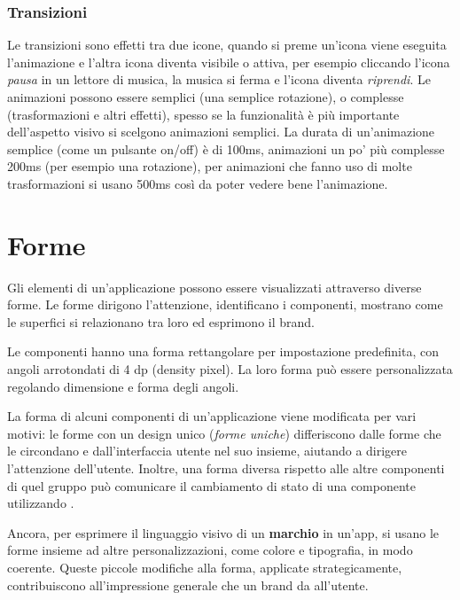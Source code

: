 \documentclass[12pt, a4paper]{report}
\begin{document}
			\subsubsection{Transizioni}
				Le transizioni sono effetti tra due icone, quando si preme un'icona viene eseguita l'animazione e l'altra icona diventa visibile o attiva, per esempio cliccando l'icona \textit{pausa} in un lettore di musica, la musica si ferma e l'icona diventa \textit{riprendi}.
				Le animazioni possono essere semplici (una semplice rotazione), o complesse (trasformazioni e altri effetti), spesso se la funzionalità è più importante dell'aspetto visivo si scelgono animazioni semplici.
				La durata di un'animazione semplice (come un pulsante on/off) è di 100ms, animazioni un po' più complesse 200ms (per esempio una rotazione), per animazioni che fanno uso di molte trasformazioni si usano 500ms così da poter vedere bene l'animazione.

	\section{Forme}
	Gli elementi di un’applicazione possono essere visualizzati attraverso diverse forme. Le forme dirigono l'attenzione, identificano i componenti, mostrano come le superfici si relazionano tra loro ed esprimono il brand.


	Le componenti hanno una forma rettangolare per impostazione predefinita, con angoli arrotondati di 4 dp (density pixel). La loro forma può essere personalizzata regolando dimensione e forma degli angoli.

	La forma di alcuni componenti di un’applicazione viene modificata per vari motivi: le forme con un design unico (\textit{forme uniche}) differiscono dalle forme che le circondano e dall'interfaccia utente nel suo insieme, aiutando a dirigere l'attenzione dell'utente.
	Inoltre, una forma diversa rispetto alle altre componenti di quel gruppo può comunicare il cambiamento di stato di una componente utilizzando .

	Ancora, per esprimere il linguaggio visivo di un \textbf{marchio} in un'app, si usano le forme insieme ad altre personalizzazioni, come colore e tipografia, in modo coerente.
	Queste piccole modifiche alla forma, applicate strategicamente, contribuiscono all'impressione generale che un brand da all’utente.
\end{document}
